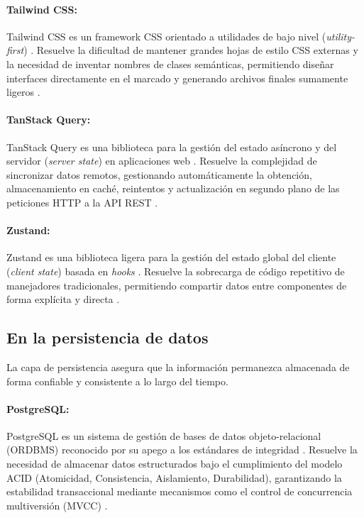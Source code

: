 	\paragraph{Tailwind CSS:} Tailwind CSS es un framework CSS orientado a utilidades de bajo nivel (\textit{utility-first}) \cite{tailwind-docs}. Resuelve la dificultad de mantener grandes hojas de estilo CSS externas y la necesidad de inventar nombres de clases sem\'anticas, permitiendo diseñar interfaces directamente en el marcado y generando archivos finales sumamente ligeros \cite{tailwind-docs}.
	
	\paragraph{TanStack Query:} TanStack Query es una biblioteca para la gesti\'on del estado as\'incrono y del servidor (\textit{server state}) en aplicaciones web \cite{tanstack-query}. Resuelve la complejidad de sincronizar datos remotos, gestionando autom\'aticamente la obtenci\'on, almacenamiento en cach\'e, reintentos y actualizaci\'on en segundo plano de las peticiones HTTP a la API REST \cite{tanstack-query}.
	
	\paragraph{Zustand:} Zustand es una biblioteca ligera para la gesti\'on del estado global del cliente (\textit{client state}) basada en \textit{hooks} \cite{zustand-docs}. Resuelve la sobrecarga de c\'odigo repetitivo de manejadores tradicionales, permitiendo compartir datos entre componentes de forma expl\'icita y directa \cite{zustand-docs}.
	
	
	\subsection{En la persistencia de datos}
	La capa de persistencia asegura que la informaci\'on permanezca almacenada de forma confiable y consistente a lo largo del tiempo.
	
	\paragraph{PostgreSQL:}	PostgreSQL es un sistema de gesti\'on de bases de datos objeto-relacional (ORDBMS) reconocido por su apego a los est\'andares de integridad \cite{postgresql-docs}. Resuelve la necesidad de almacenar datos estructurados bajo el cumplimiento del modelo ACID (Atomicidad, Consistencia, Aislamiento, Durabilidad), garantizando la estabilidad transaccional mediante mecanismos como el control de concurrencia multiversi\'on (MVCC) \cite{postgresql-docs}.
	

